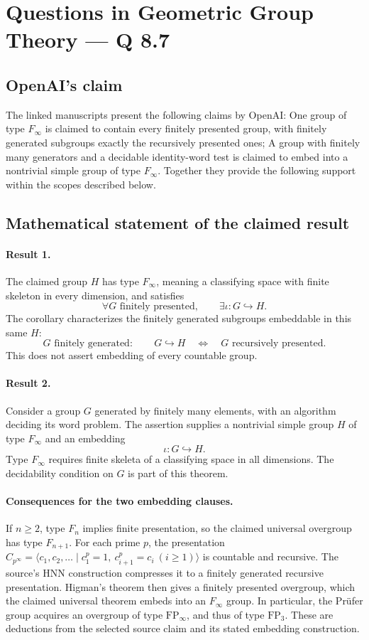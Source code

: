 \documentclass[11pt]{article}
\begin{document}
\section*{Questions in Geometric Group Theory — Q 8.7}

\subsection{OpenAI's claim}
The linked manuscripts present the following claims by OpenAI: One group of type $F_\infty$ is claimed to contain every finitely presented group, with finitely generated subgroups exactly the recursively presented ones; A group with finitely many generators and a decidable identity-word test is claimed to embed into a nontrivial simple group of type $F_\infty$. Together they provide the following support within the scopes described below.

\subsection{Mathematical statement of the claimed result}
\paragraph{Result 1.} The claimed group \(H\) has type \(F_\infty\), meaning a classifying space with finite skeleton in every dimension, and satisfies
\[
 \forall G\text{ finitely presented},\qquad\exists\iota:G\hookrightarrow H.
\]
The corollary characterizes the finitely generated subgroups embeddable in this same \(H\):
\[
 G\text{ finitely generated}:\qquad G\hookrightarrow H
 \quad\Longleftrightarrow\quad G\text{ recursively presented}.
\]
This does not assert embedding of every countable group.

\paragraph{Result 2.} Consider a group \(G\) generated by finitely many elements, with an algorithm deciding its word problem. The assertion supplies a nontrivial simple group \(H\) of type \(F_\infty\) and an embedding
\[
 \iota:G\hookrightarrow H.
\]
Type \(F_\infty\) requires finite skeleta of a classifying space in all dimensions. The decidability condition on \(G\) is part of this theorem.

\paragraph{Consequences for the two embedding clauses.}
If $n\ge2$, type $F_n$ implies finite presentation, so the claimed universal overgroup has type $F_{n+1}$. For each prime $p$, the presentation $C_{p^\infty}=\langle c_1,c_2,\ldots\mid c_1^p=1,\ c_{i+1}^p=c_i\ (i\ge1)\rangle$ is countable and recursive. The source's HNN construction compresses it to a finitely generated recursive presentation. Higman's theorem then gives a finitely presented overgroup, which the claimed universal theorem embeds into an $F_\infty$ group. In particular, the Prüfer group acquires an overgroup of type $\mathrm{FP}_\infty$, and thus of type $\mathrm{FP}_3$. These are deductions from the selected source claim and its stated embedding construction.
\end{document}
